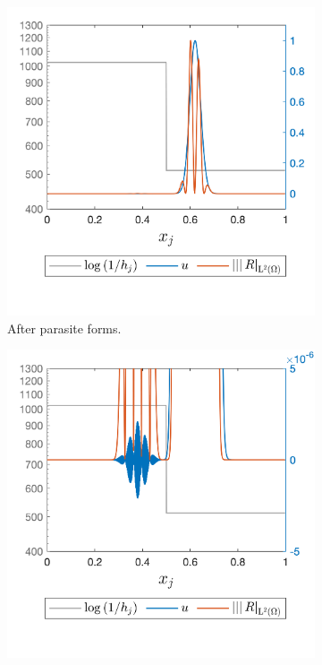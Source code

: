 \documentclass[final]{amsart}
\numberwithin{equation}{section}
\begin{document}
\begin{figure}[H]
\begin{subfigure}[b]{.3\textwidth}
		\includegraphics[width=\textwidth]{../figures/fig_CNCS_parasite_rep_3800zoom_off}	
		\caption{\label{fig:CNCS_parasite_1D_1}
			After parasite forms.
		}
	\end{subfigure}
	\begin{subfigure}[b]{.3\textwidth}
		\includegraphics[width=\textwidth]{../figures/fig_CNCS_parasite_rep_3800zoom_on}	

\end{subfigure}
\end{figure}
\end{document}
